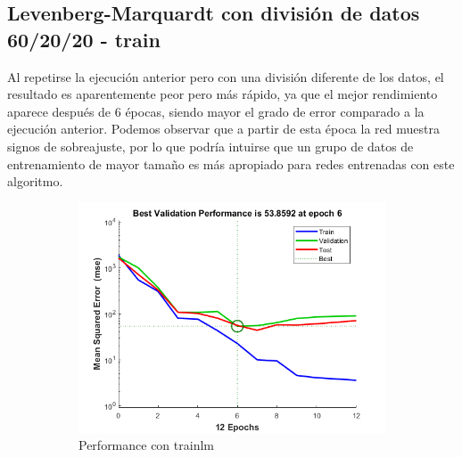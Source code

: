 \documentclass[a4paper, 12pt]{article}
\begin{document}
            
            \newpage
            \subsection{Levenberg-Marquardt con división de datos 60/20/20 - train}
                Al repetirse la ejecución anterior pero con una división diferente de los datos, el resultado es aparentemente peor pero más rápido, ya que el mejor rendimiento aparece después de 6 épocas, siendo mayor el grado de error comparado a la ejecución anterior. Podemos observar que a partir de esta época la red muestra signos de sobreajuste, por lo que podría intuirse que un grupo de datos de entrenamiento de mayor tamaño es más apropiado para redes entrenadas con este algoritmo.
                \begin{figure}[htp!]
                    \caption{Gráficas con Levenberg-Marquardt con división 60/20/20}
                    \begin{subfigure}{0.49\textwidth}
                        \centering
        		      \includegraphics[width=\textwidth]{figures/parte1/Ej3/Ej3_performance_trainlm_60.png}
                        \caption{Performance con trainlm}
                    \end{subfigure}
                    \begin{subfigure}{0.49\textwidth}

\end{subfigure}
\end{figure}
\end{document}
